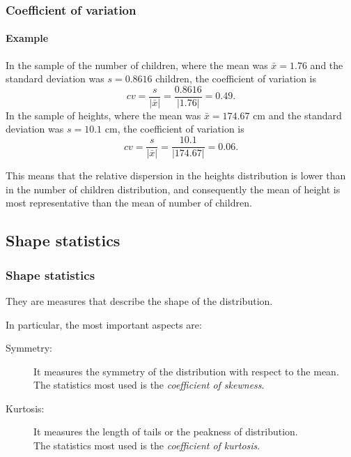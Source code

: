 \begin{frame}
\frametitle{Coefficient of variation}
\framesubtitle{Example}
In the sample of the number of children, where the mean was $\bar x=1.76$ and the standard deviation was $s=0.8616$
children, the coefficient of variation is
\[
cv = \frac{s}{|\bar x|} = \frac{0.8616}{|1.76|} = 0.49.
\]
In the sample of heights, where the mean was $\bar x=174.67$ cm and the standard deviation was $s=10.1$ cm, the
coefficient of variation is
\[
cv = \frac{s}{|\bar x|} = \frac{10.1}{|174.67|} = 0.06.
\]

This means that the relative dispersion in the heights distribution is lower than in the number of children
distribution, and consequently the mean of height is most representative than the mean of number of children.
\end{frame}


\subsection{Shape statistics}
\begin{frame}
\frametitle{Shape statistics}
They are measures that describe the shape of the distribution. 

In particular, the most important aspects are:
\begin{description}
\item[Symmetry:] It measures the symmetry of the distribution with respect to the mean. \\
The statistics most used is the \emph{coefficient of skewness}.
\item[Kurtosis:] It measures the length of tails or the peakness of distribution. \\
The statistics most used is the \emph{coefficient of kurtosis}.
\end{description}
\end{frame}

